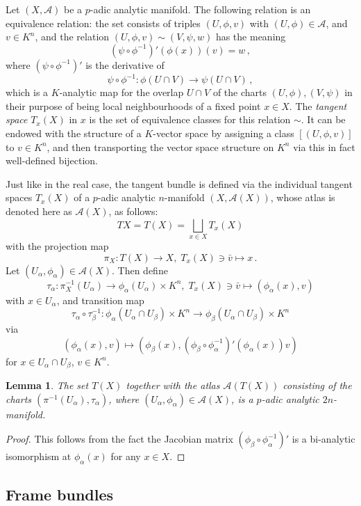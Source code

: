 \documentclass[a4paper,draft]{ZbRad}
\theoremstyle{plain}
\newtheorem{lem}{Lemma}[section]
\theoremstyle{definition}
\numberwithin{equation}{section}
\begin{document}
Let $(X,\mathcal{A})$ be a $p$-adic analytic manifold. The following relation is an equivalence relation: the set consists of triples $(U,\phi,v)$ with $(U,\phi)\in\mathcal{A}$, and $v\in K^n$, and the relation $(U,\phi,v)\sim(V,\psi,w)$ has the meaning
\[
(\psi\circ\phi^{-1})'(\phi(x))(v)=w\,,
\]
where $(\psi\circ\phi^{-1})'$ is the derivative of 
\[
\psi\circ\phi^{-1}\colon \phi(U\cap V)\to\psi(U\cap V)\,,
\]
which is a $K$-analytic map for the overlap $U\cap V$ of the charts $(U,\phi),(V,\psi)$ in their purpose of being local neighbourhoods of a fixed point $x\in X$.
The \emph{tangent space} $T_x(X)$ in $x$ is the set of equivalence classes for this relation $\sim$.
It can be endowed with the structure of a $K$-vector space by assigning a class $[(U,\phi,v)]$ to
$v\in K^n$, and then transporting the vector space structure on $K^n$ via this in fact well-defined bijection.
\newline

Just like in the real case, the tangent bundle is defined via the individual tangent spaces $T_x(X)$ of a $p$-adic analytic $n$-manifold $(X,\mathcal{A}(X))$, whose atlas is denoted here as $\mathcal{A}(X)$, as follows:
\[
TX=T(X)=\bigsqcup\limits_{x\in X}T_x(X)
\]
with the projection map
\[
\pi_X\colon T(X)\to X,\;T_x(X)\ni\bar{v}\mapsto x\,.
\]
Let $(U_\alpha,\phi_\alpha)\in\mathcal{A}(X)$. Then define
\[
\tau_\alpha\colon\pi^{-1}_X(U_\alpha)\to\phi_\alpha(U_\alpha)\times
K^n,\;T_x(X)\ni\bar{v}\mapsto(\phi_\alpha(x),v)
\]
with $x\in U_\alpha$, 
and transition map
\[
\tau_\alpha\circ\tau_\beta^{-1}\colon
\phi_\alpha(U_\alpha\cap U_\beta)\times K^n\to\phi_\beta(U_\alpha\cap U_\beta)\times K^n
\]
via
\[
(\phi_\alpha(x),v)\mapsto\left(\phi_\beta(x),\left(\phi_\beta\circ\phi_\alpha^{-1}\right)'(\phi_\alpha(x))v\right)
\]
for $x\in U_\alpha\cap U_\beta$, $v\in K^n$. 

\begin{lem}
The set $T(X)$ together with the atlas $\mathcal{A}(T(X))$ consisting of the charts $(\pi^{-1}(U_\alpha),\tau_\alpha)$, where $(U_\alpha,\phi_\alpha)\in\mathcal{A}(X)$, is a 
$p$-adic analytic $2n$-manifold.
\end{lem}

\begin{proof}
This follows from the fact  the Jacobian matrix $\left(\phi_\beta\circ\phi_\alpha^{-1}\right)'$ is a bi-analytic isomorphism at $\phi_\alpha(x)$ for any $x\in X$.
\end{proof}

\subsection{Frame bundles}
\end{document}
